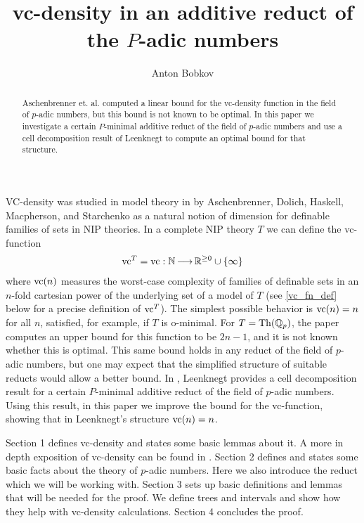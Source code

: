 \documentclass{amsart}
\title{vc-density in an additive reduct of the $P$-adic numbers}
\author{Anton Bobkov}
\newcommand{\curly}[1]{\left\{#1\right\}}
\begin{document}
\begin{abstract}
  Aschenbrenner et. al. computed a linear bound for the vc-density function in the field of $p$-adic numbers,
  but this bound is not known to be optimal.
  In this paper we investigate a certain $P$-minimal additive reduct of the field of $p$-adic numbers and
  use a cell decomposition result of Leenknegt to compute an optimal bound for that structure.
\end{abstract}


\maketitle

VC-density was studied in model theory in \cite{density} by Aschenbrenner, Dolich, Haskell, Macpherson, and Starchenko
as a natural notion of dimension for definable families of sets in NIP theories.
In a complete NIP theory $T$ we can define the vc-function
\begin{align*}
  \vc^T = \vc : \N \arr \R^{\geq 0} \cup \curly{\infty}
\end{align*}
where $\operatorname{vc}(n)$ measures the worst-case complexity of families of definable sets in an $n$-fold cartesian power of the underlying set of a model of $T$
(see \ref{vc_fn_def} below for a precise definition of $\operatorname{vc}^T$).
The simplest possible behavior is $\operatorname{vc}(n) = n$ for all $n$,
satisfied, for example, if $T$ is o-minimal.
For $T = \operatorname{Th}(\mathbb{Q}_p)$, the paper \cite{density} computes an upper bound for this function to be $2n-1$, and it is not known whether this is optimal.
This same bound holds in any reduct of the field of $p$-adic numbers, but one may expect that the simplified structure of suitable reducts would allow a better bound.
In \cite{reduct}, Leenknegt provides a cell decomposition result for a certain $P$-minimal additive reduct of the field of $p$-adic numbers.
Using this result, in this paper we improve the bound for the vc-function, showing that in Leenknegt's structure $\operatorname{vc}(n) = n$.

Section 1 defines vc-density and states some basic lemmas about it.
A more in depth exposition of vc-density can be found in \cite{density}.
Section 2 defines and states some basic facts about the theory of $p$-adic numbers.
Here we also introduce the reduct which we will be working with.
Section 3 sets up basic definitions and lemmas that will be needed for the proof.
We define trees and intervals and show how they help with vc-density calculations.
Section 4 concludes the proof.
\end{document}
